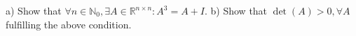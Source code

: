 a) Show that $\forall n \in \mathbb{N}_0, \exists A \in \mathbb{R}^{n\times n}: A^3=A+I$.
b) Show that $\det(A)>0, \forall A$ fulfilling the above condition.